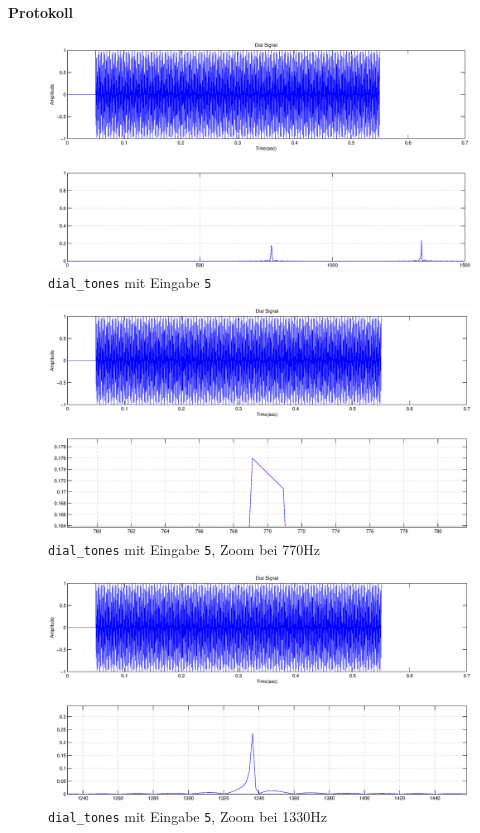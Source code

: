 \documentclass[10pt]{report}
\begin{document}
        \paragraph{Protokoll}

        \begin{center}
            \begin{figure}[H]
                \includegraphics[width=\textwidth]{img43421}
                \caption{\texttt{dial\_tones} mit Eingabe \texttt{5}}
            \end{figure}
            \begin{figure}[H]
                \includegraphics[width=\textwidth]{img43421detail}
                \caption{\texttt{dial\_tones} mit Eingabe \texttt{5}, Zoom bei 770Hz}
            \end{figure}
            \begin{figure}[H]
                \includegraphics[width=\textwidth]{img43421detail2}
                \caption{\texttt{dial\_tones} mit Eingabe \texttt{5}, Zoom bei 1330Hz}
            \end{figure}
        \end{center}
\end{document}
